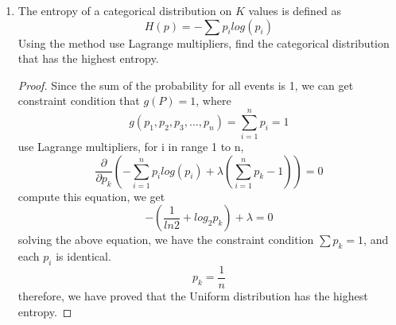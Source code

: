 \documentclass[]{book}
\theoremstyle{definition}
\begin{document}
\begin{enumerate}
\begin{enumerate}
\begin{proof}
		$$ left \leq \lambda f(a)g(a) + (1-\lambda)f(b)g(b) = \lambda u(a) + (1-\lambda)u(b)$$
		therefore function  $fg$ is convex
	\end{proof}
\end{enumerate} 
\item The entropy of a categorical distribution on $K$ values is defined as 
$$H(p)=-\sum p_i log(p_i)$$
Using the method use Lagrange multipliers, find the categorical distribution that has the highest entropy.
\begin{proof}
	Since the sum of the probability for all events is 1, we can get constraint condition that $g(P)=1$, where
	$$g(p_1,p_2, p_3,...,p_n)=\sum_{i=1}^{n} p_i = 1 $$
	use Lagrange multipliers, for i in range 1 to n,
	$$\frac{\partial}{\partial p_k}(-\sum_{i=1}^{n}p_i log(p_i) + \lambda(\sum_{i=1}^{n}p_k -1))=0$$
	compute this equation, we get 
	$$-(\frac{1}{ln 2 }+ log_2 p_k)+ \lambda = 0$$
	solving the above equation, we have the constraint condition $\sum p_k =1$, and each $p_i$ is identical. 
	$$ p_k = \frac{1}{n}$$
	therefore, we have proved that the Uniform distribution has the highest entropy.
\end{proof}
\end{enumerate}

\end{document}
